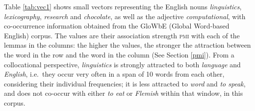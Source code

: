 \documentclass[
]{book}
\begin{document}
Table \ref{tab:vec1} shows small vectors representing the English nouns \emph{linguistics}, \emph{lexicography}, \emph{research} and \emph{chocolate}, as well as the adjective \emph{computational}, with co-occurrence information obtained from the GloWbE (Global Word-based English) corpus. The values are their association strength \textsc{pmi} with each of the lemmas in the columns: the higher the values, the stronger the attraction between the word in the row and the word in the column (See Section \ref{pmi}). From a collocational perspective, \emph{linguistics} is strongly attracted to both \emph{language} and \emph{English}, i.e.~they occur very often in a span of 10 words from each other, considering their individual frequencies; it is less attracted to \emph{word} and \emph{to speak}, and does not co-occur with either \emph{to eat} or \emph{Flemish} within that window, in this corpus.



\begin{table}

\caption{\label{tab:vec1}Small example of type-level vectors, with \textsc{pmi} values based on a symmetric window of 10. Frequency data extracted from GloWbE.}
\centering
{}
\end{table}
\end{document}
